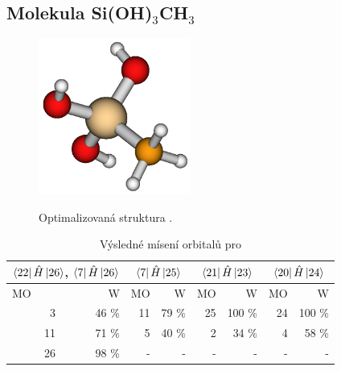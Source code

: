\documentclass[
  digital, %
  table,   %
  lof,     %
  lot,     %
]{fithesis3}
\begin{document}
\subsection{Molekula Si(OH)$_3$CH$_3$}
\begin{figure}[h!]
\caption{Optimalizovaná struktura . }
  \center
  \includegraphics[width=5cm]{si(oh)3ch3_obr.png}
  \label{obr_sioh3ch3_opt_struktura}
  \end{figure}
  
\begin{table}[htbp]
\caption{Výsledné mísení orbitalů pro }
\begin{center}
\begin{tabular}{|r|r|r|r|r|r|r|r|}
\hline
\multicolumn{2}{|c|}{$\bra{22}{\hat{H}}\ket{26}$, $\bra{7}{\hat{H}}\ket{26}$} & \multicolumn{2}{|c|}{$\bra{7}{\hat{H}}\ket{25}$}& \multicolumn{2}{|c|}{$\bra{21}{\hat{H}}\ket{23}$} &\multicolumn{2}{|c|}{$\bra{20}{\hat{H}}\ket{24}$} \\
\hline
\hline
\multicolumn{1}{|l|}{MO} & \multicolumn{1}{r|}{W} & \multicolumn{1}{l|}{MO} & \multicolumn{1}{r|}{W} & MO & \multicolumn{1}{r|}{W}& MO & \multicolumn{1}{r|}{W} \\ \hline
3 & 46 \% & 11 & 79 \% &25 & 100 \%& 24 & 100 \% \\ \hline
11 & 71 \% & 5 & 40 \% & 2 & 34 \% &4 & 58 \% \\ \hline
26 & 98 \% & - & - &  -& - &-&- \\ \hline
\end{tabular}
\end{center}
\label{tab_sioh3ch3_vysledky}
\end{table}
\end{document}
